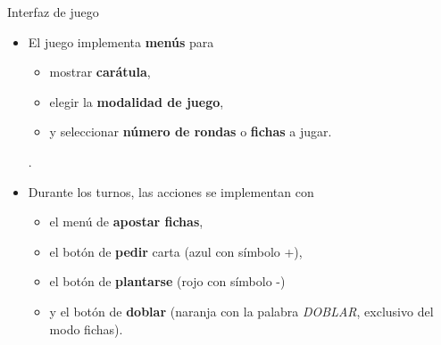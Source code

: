 \begin{frame}{Interfaz de juego}
    \begin{itemize}
        \item El juego implementa \textbf{menús} para
        \begin{itemize}
            \item mostrar \textbf{carátula},
            \item elegir la \textbf{modalidad de juego},
            \item y seleccionar \textbf{número de rondas} o \textbf{fichas} a jugar.
        \end{itemize}.
        \item Durante los turnos, las acciones se implementan con
        \begin{itemize}
        \item el menú de \textbf{apostar fichas},
            \item el botón de \textbf{pedir} carta (azul con símbolo +),
            \item el botón de \textbf{plantarse} (rojo con símbolo -)
            \item y el botón de \textbf{doblar} (naranja con la palabra \textit{DOBLAR}, exclusivo del modo fichas).
        \end{itemize}
    \end{itemize}
\end{frame}

